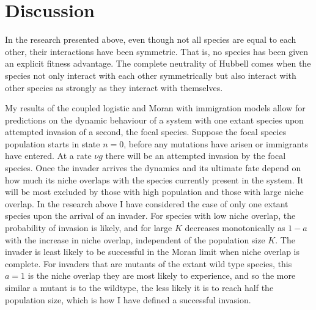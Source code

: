 \section{Discussion}

In the research presented above, even though not all species are equal to each other, their interactions have been symmetric. 
That is, no species has been given an explicit fitness advantage. 
The complete neutrality of Hubbell comes when the species not only interact with each other symmetrically but also interact with other species as strongly as they interact with themselves. 

My results of the coupled logistic and Moran with immigration models allow for predictions on the dynamic behaviour of a system with one extant species upon attempted invasion of a second, the focal species. 
Suppose the focal species population starts in state $n=0$, before any mutations have arisen or immigrants have entered.  
At a rate $\nu g$ there will be an attempted invasion by the focal species. 
Once the invader arrives the dynamics and its ultimate fate depend on how much its niche overlaps with the species currently present in the system. 
It will be most excluded by those with high population and those with large niche overlap. 
In the research above I have considered the case of only one extant species upon the arrival of an invader. 
For species with low niche overlap, the probability of invasion is likely, and for large $K$ decreases monotonically as $1-a$ with the increase in niche overlap, independent of the population size $K$. %
The invader is least likely to be successful in the Moran limit when niche overlap is complete. 
For invaders that are mutants of the extant wild type species, this $a=1$ is the niche overlap they are most likely to experience, and so the more similar a mutant is to the wildtype, the less likely it is to reach half the population size, which is how I have defined a successful invasion. 

